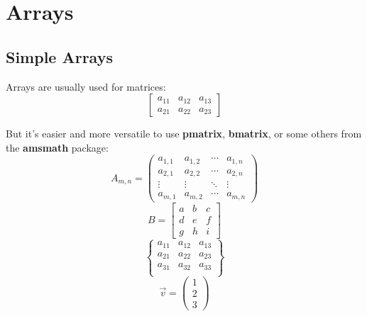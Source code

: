 \documentclass[12pt]{article}
\begin{document}
\section{Arrays}

\subsection{Simple Arrays}

Arrays are usually used for matrices:
\begin{equation*}
    \left[
        \begin{array}{ ccc }
            a_{11} & a_{12} & a_{13} \\
            a_{21} & a_{22} & a_{23}
        \end{array}
    \right]
\end{equation*}

\noindent But it's easier and more versatile to use \textbf{pmatrix}, \textbf{bmatrix}, or some others from the \textbf{amsmath} package: \\
\begin{equation*}
    A_{m,n} =
    \begin{pmatrix}
    a_{1,1} & a_{1,2} & \cdots & a_{1,n} \\
    a_{2,1} & a_{2,2} & \cdots & a_{2,n} \\
    \vdots  & \vdots  & \ddots & \vdots  \\
    a_{m,1} & a_{m,2} & \cdots & a_{m,n}
    \end{pmatrix}
\end{equation*}
\begin{equation*}
    B =
    \begin{bmatrix}
    a & b & c \\
    d & e & f \\
    g & h & i
    \end{bmatrix}
\end{equation*}
\begin{equation*}
    \begin{Bmatrix}
    a_{11} & a_{12} & a_{13}  \\
    a_{21} & a_{22} & a_{23}  \\
    a_{31} & a_{32} & a_{33}  \\
    \end{Bmatrix}
\end{equation*}
\begin{equation*}
    \overrightarrow{v} = \left(\begin{array}{ c }1 \\ 2 \\ 3\end{array}\right)
\end{equation*}
\end{document}
